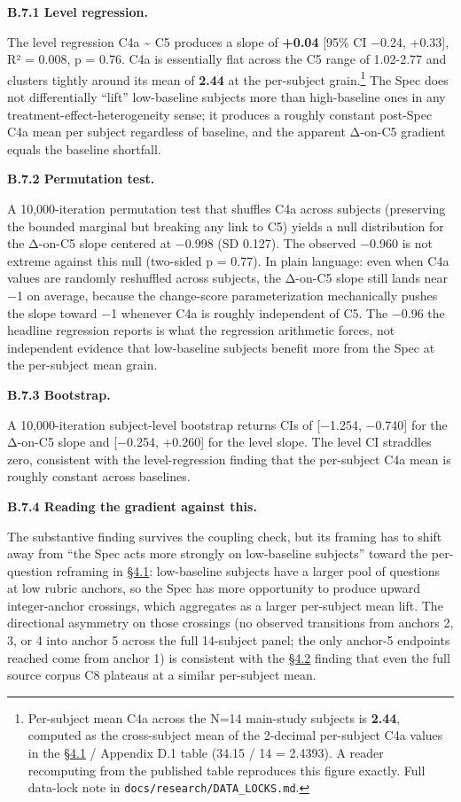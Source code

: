 \textbf{B.7.1 Level regression.}

The level regression C4a \textasciitilde{} C5 produces a slope of
\textbf{+0.04} {[}95\% CI −0.24, +0.33{]}, R² = 0.008, p = 0.76. C4a is
essentially flat across the C5 range of 1.02-2.77 and clusters tightly
around its mean of \textbf{2.44} at the per-subject grain.\footnote{Per-subject
  mean C4a across the N=14 main-study subjects is \textbf{2.44},
  computed as the cross-subject mean of the 2-decimal per-subject C4a
  values in the \hyperref[the-cross-subject-gradient-and-its-per-question-mechanism]{§4.1} / Appendix D.1 table (34.15 / 14 = 2.4393). A
  reader recomputing from the published table reproduces this figure
  exactly. Full data-lock note in \texttt{docs/research/DATA\_LOCKS.md}.}
The Spec does not differentially ``lift'' low-baseline subjects more
than high-baseline ones in any treatment-effect-heterogeneity sense; it
produces a roughly constant post-Spec C4a mean per subject regardless of
baseline, and the apparent Δ-on-C5 gradient equals the baseline
shortfall.

\textbf{B.7.2 Permutation test.}

A 10,000-iteration permutation test that shuffles C4a across subjects
(preserving the bounded marginal but breaking any link to C5) yields a
null distribution for the Δ-on-C5 slope centered at −0.998 (SD 0.127).
The observed −0.960 is not extreme against this null (two-sided p =
0.77). In plain language: even when C4a values are randomly reshuffled
across subjects, the Δ-on-C5 slope still lands near −1 on average,
because the change-score parameterization mechanically pushes the slope
toward −1 whenever C4a is roughly independent of C5. The −0.96 the
headline regression reports is what the regression arithmetic forces,
not independent evidence that low-baseline subjects benefit more from
the Spec at the per-subject mean grain.

\textbf{B.7.3 Bootstrap.}

A 10,000-iteration subject-level bootstrap returns CIs of {[}−1.254,
−0.740{]} for the Δ-on-C5 slope and {[}−0.254, +0.260{]} for the level
slope. The level CI straddles zero, consistent with the level-regression
finding that the per-subject C4a mean is roughly constant across
baselines.

\textbf{B.7.4 Reading the gradient against this.}

The substantive finding survives the coupling check, but its framing has
to shift away from ``the Spec acts more strongly on low-baseline
subjects'' toward the per-question reframing in \hyperref[the-cross-subject-gradient-and-its-per-question-mechanism]{§4.1}: low-baseline
subjects have a larger pool of questions at low rubric anchors, so the
Spec has more opportunity to produce upward integer-anchor crossings,
which aggregates as a larger per-subject mean lift. The directional
asymmetry on those crossings (no observed transitions from anchors 2, 3,
or 4 into anchor 5 across the full 14-subject panel; the only anchor-5
endpoints reached come from anchor 1) is consistent with the \hyperref[compression-structure-vs.-raw-text]{§4.2}
finding that even the full source corpus C8 plateaus at a similar
per-subject mean.

